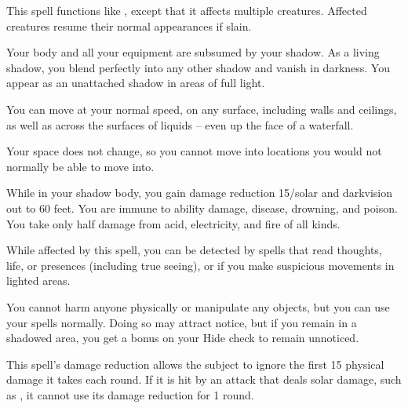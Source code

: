 \spellrng{\rngclose}
\begin{spelleffect}
  This spell functions like , except that it affects multiple creatures. Affected creatures resume their normal appearances if slain.
\end{spelleffect}

\begin{spelleffect}
  Your body and all your equipment are subsumed by your shadow. As a living shadow, you blend perfectly into any other shadow and vanish in darkness. You appear as an unattached shadow in areas of full light.
  \par You can move at your normal speed, on any surface, including walls and ceilings, as well as across the surfaces of liquids -- even up the face of a waterfall.
  \par Your space does not change, so you cannot move into locations you would not normally be able to move into.
  \par While in your shadow body, you gain damage reduction 15/solar and darkvision out to 60 feet. You are immune to ability damage, disease, drowning, and poison. You take only half damage from acid, electricity, and fire of all kinds.
  \par While affected by this spell, you can be detected by spells that read thoughts, life, or presences (including true seeing), or if you make suspicious movements in lighted areas.
  \par You cannot harm anyone physically or manipulate any objects, but you can use your spells normally. Doing so may attract notice, but if you remain in a shadowed area, you get a  bonus on your Hide check to remain unnoticed.
\end{spelleffect}
\begin{spellnotes}
  This spell's damage reduction allows the subject to ignore the first 15 physical damage it takes each round. If it is hit by an attack that deals solar damage, such as , it cannot use its damage reduction for 1 round.
\end{spellnotes}

